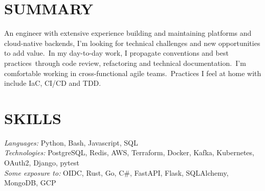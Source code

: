 \documentclass[line,margin]{res}
\begin{document}
\address{}
\address{\href{mailto://simon.r.crowe@protonmail.com}{simon.r.crowe@protonmail.com}}


\begin{resume}

\section{SUMMARY} An engineer with extensive experience building and maintaining
                  platforms and cloud-native backends, I'm looking for technical challenges
                  and new opportunities to add value.\
                  In my day-to-day work, I propagate conventions and best practices\
                  through code review, refactoring and technical documentation.\
                  I’m comfortable working in cross-functional agile teams.\
                  Practices I feel at home with include IaC, CI/CD and TDD.

\section{SKILLS} {\sl Languages:} Python, Bash, Javascript, SQL \\
                {\sl Technologies:} PostgreSQL, Redis, AWS, Terraform, Docker, Kafka, Kubernetes, OAuth2, Django, pytest \\
                {\sl Some exposure to:} OIDC, Rust, Go, C\#, FastAPI, Flask, SQLAlchemy, MongoDB, GCP



\end{resume}
\end{document}
